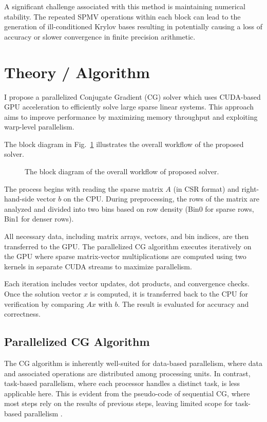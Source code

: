 \documentclass[conference]{IEEEtran}
\begin{document}
A significant challenge associated with this method is maintaining numerical stability. The repeated SPMV operations within each block can lead to the generation of ill-conditioned Krylov bases resulting in potentially causing a loss of accuracy or slower convergence in finite precision arithmetic.

\section{Theory / Algorithm}
I propose a parallelized Conjugate Gradient (CG) solver which uses CUDA-based GPU acceleration to efficiently solve large sparse linear systems. This approach aims to improve performance by maximizing memory throughput and exploiting warp-level parallelism.

The block diagram in Fig.~\ref{figflow} illustrates the overall workflow of the proposed solver. 

\begin{figure}[htbp]
\centerline{}
\caption{The block diagram of the overall workflow of proposed solver.}
\label{figflow}
\end{figure}

The process begins with reading the sparse matrix $A$ (in CSR format) and right-hand-side vector $b$ on the CPU. During preprocessing, the rows of the matrix are analyzed and divided into two bins based on row density (Bin0 for sparse rows, Bin1 for denser rows). 

All necessary data, including matrix arrays, vectors, and bin indices, are then transferred to the GPU. The parallelized CG algorithm executes iteratively on the GPU where sparse matrix-vector multiplications are computed using two kernels in separate CUDA streams to maximize parallelism. 

Each iteration includes vector updates, dot products, and convergence checks. Once the solution vector $x$ is computed, it is transferred back to the CPU for verification by comparing $Ax$ with $b$. The result is evaluated for accuracy and correctness.

\subsection{Parallelized CG Algorithm}
The CG algorithm is inherently well-suited for data-based parallelism, where data and associated operations are distributed among processing units. In contrast, task-based parallelism, where each processor handles a distinct task, is less applicable here. This is evident from the pseudo-code of sequential CG, where most steps rely on the results of previous steps, leaving limited scope for task-based parallelism \cite{b1}.
\end{document}
